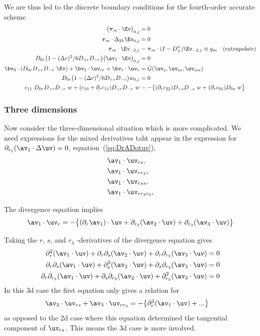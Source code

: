 \documentclass[10pt]{article}
\newcommand{\rc}{{r_3}}%
\begin{document}
We are thus led to the discrete boundary conditions for the fourth-order accurate scheme
\begin{align*}
    \big(\tauv_m\cdot\Ev\big)_{0,j}  &=0  \\
 \tauv_m\cdot\Delta_{2h} \Ev_{0,j}  &=0  \\
 \tauv_m\cdot\Ev_{-2,j} &= \tauv_m \cdot (I-D_+^4)\Ev_{-2,j} \equiv g_m   \quad\mbox{(extrapolate)} \\
  D_{0r}\big(1- (\Delta r)^2/6 D_{+r}D_{-r}\big) \big(\av_1\cdot\Ev\big)_{0,j} &= 0 \\
  \bv_3\cdot(D_{0r}D_{+r}D_{-r}~\Ev) + \bv_2\cdot\uv_{rr} + \bv_1\cdot\uv_{r} &= G(\uv_s,\uv_{ss},\uv_{sss})\\
  D_{0r}\big(1- (\Delta r)^2/6 D_{+r}D_{-r}\big) w_{0,j} &= 0 \\
  c_{11}~D_{0r}D_{+r}D_{-r}~w + (c_{10}+\partial_r c_{11})D_{+r}D_{-r}~w &=
        -\big\{ (\partial_r c_{22})D_{+s}D_{-s}~w + (\partial_r c_{01})D_{0s}~w \big\}       
\end{align*}


\subsubsection{Three dimensions}

Now consider the three-dimensional situation which is more complicated.
We need expressions for the mixed derivatives taht appear in the expression for $\pra(\av_1\cdot\Delta\uv)=0$,
equation~(\ref{eq:DrADotuv}),
\begin{align}
   &\av_1\cdot\uv_{rs}, \\
   &\av_1\cdot\uv_{r\rc}, \\
   &\av_1\cdot\uv_{rss}, \\
   &\av_1\cdot\uv_{r\rc\rc},
\end{align}

The divergence equation implies
\[
  \av_1\cdot\uv_r = -\big\{ (\partial_r\av_1)\cdot\uv + \prb(\av_2\cdot\uv)+\prc(\av_3\cdot\uv) \big\}
\]

Taking the $r$, $s$, and $\rc$ -derivatives of the divergence equation gives
\begin{align*}
   \partial_r^2(\av_1\cdot\uv) + \partial_r\partial_s(\av_2\cdot\uv)+ \partial_r\partial_\rc(\av_3\cdot\uv) &=0 \\
   \partial_r\partial_s(\av_1\cdot\uv) + \partial_s^2(\av_2\cdot\uv)+ \partial_s\prc(\av_3\cdot\uv) &=0 \\
   \partial_r\prc(\av_1\cdot\uv) + \partial_s\prc(\av_2\cdot\uv)+ \prc^2(\av_3\cdot\uv) &=0
\end{align*}
In this 3d case the first equation only gives a relation for 
\begin{align*}
  \av_2\cdot\uv_{rs} + \av_3\cdot\uv_{r\rc} &= -\big\{ \partial_r^2(\av_1\cdot\uv) + ... \big\} 
\end{align*}
as opposed to the 2d case where this equation determined the tangential component of $\uv_{rs}$. This means
the 3d case is more involved.
\end{document}
